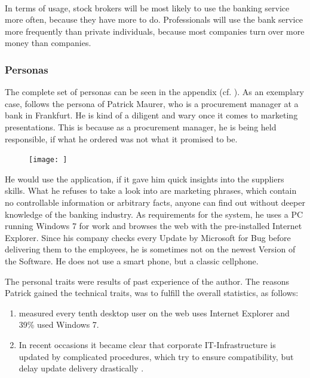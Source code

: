 \paragraph{} In terms of usage, stock brokers will be most likely to use the banking service more often, because they have more to do. Professionals will use the bank service more frequently than private individuals, because most companies turn over more money than companies. 

\subsubsection{Personas}
The complete set of personas can be seen in the appendix (cf. \cpagerefrange{}{}). As an exemplary case, follows the persona of Patrick Maurer, who is a procurement manager at a bank in Frankfurt. He is kind of a diligent and wary once it comes to marketing presentations. This is because as a procurement manager, he is being held responsible, if what he ordered was not what it promised to be. 

\begin{figure}
    \centering
    \texttt{[image: ]}
    \caption[]{}
    \label{fig:}
\end{figure}

He would use the application, if it gave him quick insights into the suppliers skills. What he refuses to take a look into are marketing phrases, which contain no controllable information or arbitrary facts, anyone can find out without deeper knowledge of the banking industry. As requirements for the system, he uses a PC running Windows 7 for work and browses the web with the pre-installed Internet Explorer. Since his company checks every Update by Microsoft for Bug before delivering them to the employees, he is sometimes not on the newest Version of the Software. He does not use a smart phone, but a classic cellphone.

The personal traits were results of past experience of the author. The reasons Patrick gained the technical traits, was to fulfill the overall statistics, as follows:
\begin{enumerate}
    \item \textcite{StatCounter.2017} measured every tenth desktop user on the web uses Internet Explorer and 39\% used Windows 7. 
    \item In recent occasions it became clear that corporate IT-Infrastructure is updated by complicated procedures, which try to ensure compatibility, but delay update delivery drastically \parencites{Gierow.2017}{Zivadinovic.13.05.2017}.
\end{enumerate}

